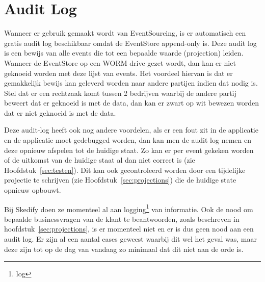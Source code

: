 
\section{Audit Log}
\label{sec:audit-log}

Wanneer er gebruik gemaakt wordt van EventSourcing, is er automatisch een gratis audit log beschikbaar omdat de EventStore append-only is. Deze audit log is een bewijs van alle events die tot een bepaalde waarde (projection) leiden. Wanneer de EventStore op een \gls{WORM} drive gezet wordt, dan kan er niet geknoeid worden met deze lijst van events. Het voordeel hiervan is dat er gemakkelijk bewijs kan geleverd worden naar andere partijen indien dat nodig is. Stel dat er een rechtzaak komt tussen 2 bedrijven waarbij de andere partij beweert dat er geknoeid is met de data, dan kan er zwart op wit bewezen worden dat er niet geknoeid is met de data.

Deze audit-log heeft ook nog andere voordelen, als er een fout zit in de applicatie en de applicatie moet gedebugged worden, dan kan men de audit log nemen en deze opnieuw afspelen tot de huidige staat. Zo kan er per event gekeken worden of de uitkomst van de huidige staat al dan niet correct is (zie Hoofdstuk~\ref{sec:testen}). Dit kan ook gecontroleerd worden door een tijdelijke projectie te schrijven (zie Hoofdstuk~\ref{sec:projections}) die de huidige \gls{state} opnieuw opbouwt.

Bij Skedify doen ze momenteel al aan logging\footnote{\glsdesc{log}} van informatie. Ook de nood om bepaalde businessvragen van de klant te beantwoorden, zoals beschreven in hoofdstuk~\ref{sec:projections}, is er momenteel niet en er is dus geen nood aan een audit log. Er zijn al een aantal cases geweest waarbij dit wel het geval was, maar deze zijn tot op de dag van vandaag zo minimaal dat dit niet aan de orde is.
